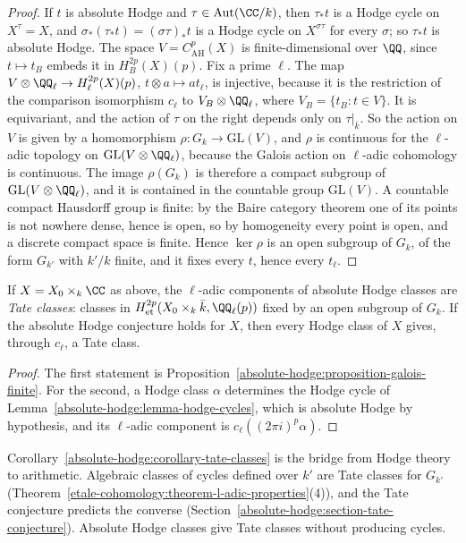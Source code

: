 \begin{proof}
If $t$ is absolute Hodge and $\tau \in \mathrm{Aut}(\CC/k)$, then $\tau_*t$ is a Hodge cycle on $X^\tau = X$, and $\sigma_*(\tau_*t) = (\sigma\tau)_*t$ is a Hodge cycle on $X^{\sigma\tau}$ for every $\sigma$; so $\tau_*t$ is
absolute Hodge. The space $V = C^p_{\mathrm{AH}}(X)$ is finite-dimensional over $\QQ$, since $t \mapsto t_B$ embeds it in $H^{2p}_B(X)(p)$. Fix a prime $\ell$. The map $V \otimes \QQ_\ell \to H^{2p}_\ell(X)(p)$,
$t \otimes a \mapsto at_\ell$, is injective, because it is the restriction of the comparison isomorphism $c_\ell$ to $V_B \otimes \QQ_\ell$, where $V_B = \{t_B : t \in V\}$. It is equivariant, and the action of
$\tau$ on the right depends only on $\tau|_{\bar k}$. So the action on $V$ is given by a homomorphism $\rho \colon G_k \to \mathrm{GL}(V)$, and $\rho$ is continuous for the $\ell$-adic topology on
$\mathrm{GL}(V \otimes \QQ_\ell)$, because the Galois action on $\ell$-adic cohomology is continuous. The image $\rho(G_k)$ is therefore a compact subgroup of $\mathrm{GL}(V \otimes \QQ_\ell)$, and it is contained in
the countable group $\mathrm{GL}(V)$. A countable compact Hausdorff group is finite: by the Baire category theorem one of its points is not nowhere dense, hence is open, so by homogeneity every
point is open, and a discrete compact space is finite. Hence $\ker\rho$ is an open subgroup of $G_k$, of the form $G_{k'}$ with $k'/k$ finite, and it fixes every $t$, hence every $t_\ell$.
\end{proof}

\begin{corollary}\label{absolute-hodge:corollary-tate-classes}
If $X = X_0 \times_k\CC$ as above, the $\ell$-adic components of absolute Hodge classes are \emph{Tate classes}: classes in $H^{2p}_{\mathrm{et}}(X_0 \times_k\bar k, \QQ_\ell(p))$ fixed by an open subgroup
of $G_k$. If the absolute Hodge conjecture holds for $X$, then every Hodge class of $X$ gives, through $c_\ell$, a Tate class.
\end{corollary}

\begin{proof}
The first statement is Proposition~\ref{absolute-hodge:proposition-galois-finite}. For the second, a Hodge class $\alpha$ determines the Hodge cycle of Lemma~\ref{absolute-hodge:lemma-hodge-cycles}, which is
absolute Hodge by hypothesis, and its $\ell$-adic component is $c_\ell((2\pi i)^p\alpha)$.
\end{proof}

\begin{remark}\label{absolute-hodge:remark-hodge-to-tate}
Corollary~\ref{absolute-hodge:corollary-tate-classes} is the bridge from Hodge theory to arithmetic. Algebraic classes of cycles defined over $k'$ are Tate classes for $G_{k'}$
(Theorem~\ref{etale-cohomology:theorem-l-adic-properties}(4)), and the Tate conjecture predicts the converse (Section~\ref{absolute-hodge:section-tate-conjecture}). Absolute Hodge classes give Tate classes without
producing cycles.
\end{remark}

